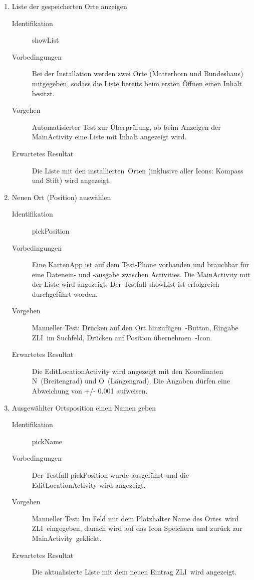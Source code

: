 \documentclass[12pt,a4paper]{scrartcl}
\begin{document}
\begin{enumerate}
  \item Liste der gespeicherten Orte anzeigen

  \begin{description}
    \item [Identifikation] showList
    \item [Vorbedingungen] Bei der Installation werden zwei Orte (Matterhorn und Bundeshaus) mitgegeben, sodass die Liste bereits beim ersten Öffnen einen Inhalt besitzt.
    \item [Vorgehen] Automatisierter Test zur Überprüfung, ob beim Anzeigen der MainActivity eine Liste mit Inhalt angezeigt wird.
    \item [Erwartetes Resultat] Die Liste mit den \dq installierten\dq\ Orten (inklusive aller Icons: Kompass und Stift) wird angezeigt.
  \end{description}

  \item Neuen Ort (Position) auswählen

  \begin{description}
    \item [Identifikation] pickPosition
    \item [Vorbedingungen] Eine KartenApp ist auf dem Test-Phone vorhanden und brauchbar für eine Datenein- und -ausgabe zwischen Activities. Die MainActivity mit der Liste wird angezeigt. Der Testfall showList ist erfolgreich durchgeführt worden.
    \item [Vorgehen] Manueller Test; Drücken auf den \dq Ort hinzufügen\dq\ -Button, Eingabe \dq ZLI\dq\ im Suchfeld, Drücken auf \dq Position übernehmen\dq\ -Icon.
    \item [Erwartetes Resultat] Die EditLocationActivity wird angezeigt mit den Koordinaten  N\dq\ (Breitengrad) und  O\dq\ (Längengrad). Die Angaben dürfen eine Abweichung von +/- 0.001 aufweisen.
  \end{description}

  \pagebreak

  \item Ausgewählter Ortsposition einen Namen geben

  \begin{description}
    \item [Identifikation] pickName
    \item [Vorbedingungen] Der Testfall pickPosition wurde ausgeführt und die EditLocationActivity wird angezeigt.
    \item [Vorgehen] Manueller Test; Im Feld mit dem Platzhalter \dq Name des Ortes\dq\ wird \dq ZLI\dq\ eingegeben, danach wird auf das Icon \dq Speichern und zurück zur MainActivity\dq\ geklickt.
    \item [Erwartetes Resultat] Die aktualisierte Liste mit dem neuen Eintrag \dq ZLI\dq\ wird angezeigt.
  \end{description}


\end{enumerate}
\end{document}
